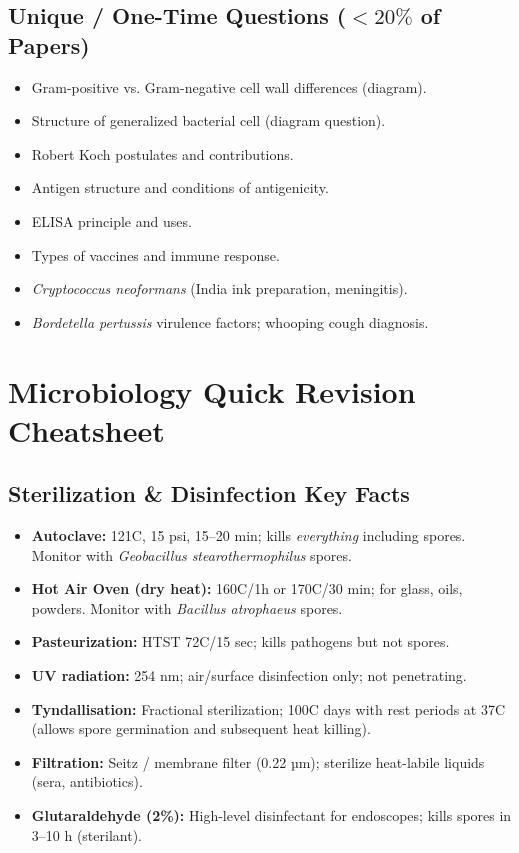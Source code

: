 \documentclass[11pt,a4paper]{article}
\begin{document}
\subsection{Unique / One-Time Questions ($<20\%$ of Papers)}
\begin{itemize}[leftmargin=*]
    \item Gram-positive vs. Gram-negative cell wall differences (diagram).
    \item Structure of generalized bacterial cell (diagram question).
    \item Robert Koch postulates and contributions.
    \item Antigen structure and conditions of antigenicity.
    \item ELISA principle and uses.
    \item Types of vaccines and immune response.
    \item \textit{Cryptococcus neoformans} (India ink preparation, meningitis).
    \item \textit{Bordetella pertussis} virulence factors; whooping cough diagnosis.
\end{itemize}

\newpage
\appendix
\section{Microbiology Quick Revision Cheatsheet}

\subsection{Sterilization \& Disinfection Key Facts}
\begin{itemize}[leftmargin=*]
    \item \textbf{Autoclave:} 121\textdegree C, 15 psi, 15--20 min; kills \textit{everything} including spores. Monitor with \textit{Geobacillus stearothermophilus} spores.
    \item \textbf{Hot Air Oven (dry heat):} 160\textdegree C/1h or 170\textdegree C/30 min; for glass, oils, powders. Monitor with \textit{Bacillus atrophaeus} spores.
    \item \textbf{Pasteurization:} HTST 72\textdegree C/15 sec; kills pathogens but not spores.
    \item \textbf{UV radiation:} 254 nm; air/surface disinfection only; not penetrating.
    \item \textbf{Tyndallisation:} Fractional sterilization; 100\textdegree C  days with rest periods at 37\textdegree C (allows spore germination and subsequent heat killing).
    \item \textbf{Filtration:} Seitz / membrane filter (0.22 µm); sterilize heat-labile liquids (sera, antibiotics).
    \item \textbf{Glutaraldehyde (2\%):} High-level disinfectant for endoscopes; kills spores in 3--10 h (sterilant).
\end{itemize}
\end{document}
